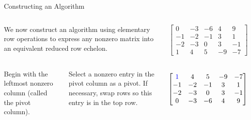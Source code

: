\documentclass[xcolor=dvipsnames,aspectratio=169,t]{beamer}
\begin{document}
\begin{frame}{Constructing an Algorithm}

  \begin{columns}[T]
    
    \column{0.65\tw}
 We now construct an algorithm using \alert{elementary row operations} to express any nonzero matrix into an equivalent reduced row echelon.

\column{0.35\tw}
 
\[ \begin{bmatrix} 0 & -3 & -6 & 4 & 9\\
  -1 & -2 & -1 & 3 & 1 \\
  -2 & -3 & 0 & 3 & -1\\
1 & 4 & 5 & -9 & -7 \end{bmatrix} \]

  \end{columns}

\begin{columns}[c]
    
    \column{0.65\tw}
  
 \bb
 \ii Begin with the leftmost nonzero column (called the \alert{pivot column}).

 \ii Select a nonzero entry in the pivot column as a \alert{pivot}. 
  If necessary, swap rows so this entry is in the top row.

 

 \ee

\column{0.35\tw}

\[ \begin{bmatrix}   \textcolor{blue}{1} & 4 & 5 & -9 & -7\\
  -1 & -2 & -1 & 3 & 1 \\
  -2 & -3 & 0 & 3 & -1\\
0 & -3 & -6 & 4 & 9  \end{bmatrix} \]


\end{columns}

\end{frame}
\end{document}
